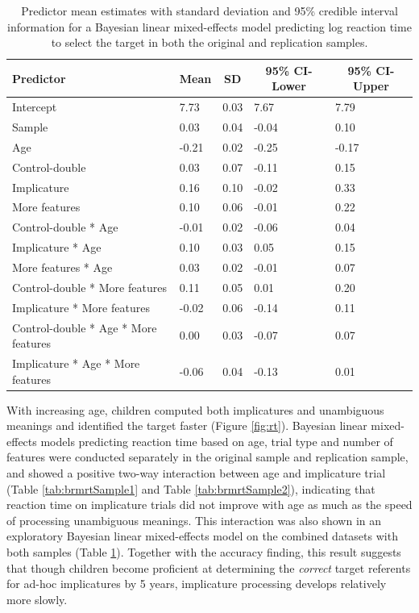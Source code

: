 \documentclass[man]{apa6}
\begin{document}
\begin{table}[tbp]
\begin{center}
\begin{threeparttable}
\caption{\label{tab:brmrt}Predictor mean estimates with standard deviation and 95\% credible interval information for a Bayesian linear mixed-effects model predicting log reaction time to select the target in both the original and replication samples.}
\begin{tabular}{lllll}
\toprule
Predictor & \multicolumn{1}{c}{Mean} & \multicolumn{1}{c}{SD} & \multicolumn{1}{c}{95\% CI-Lower} & \multicolumn{1}{c}{95\% CI-Upper}\\
\midrule
Intercept & 7.73 & 0.03 & 7.67 & 7.79\\
Sample & 0.03 & 0.04 & -0.04 & 0.10\\
Age & -0.21 & 0.02 & -0.25 & -0.17\\
Control-double & 0.03 & 0.07 & -0.11 & 0.15\\
Implicature & 0.16 & 0.10 & -0.02 & 0.33\\
More features & 0.10 & 0.06 & -0.01 & 0.22\\
Control-double * Age & -0.01 & 0.02 & -0.06 & 0.04\\
Implicature * Age & 0.10 & 0.03 & 0.05 & 0.15\\
More features * Age & 0.03 & 0.02 & -0.01 & 0.07\\
Control-double * More features & 0.11 & 0.05 & 0.01 & 0.20\\
Implicature * More features & -0.02 & 0.06 & -0.14 & 0.11\\
Control-double * Age * More features & 0.00 & 0.03 & -0.07 & 0.07\\
Implicature * Age * More features & -0.06 & 0.04 & -0.13 & 0.01\\
\bottomrule
\end{tabular}
\end{threeparttable}
\end{center}
\end{table}

With increasing age, children computed both implicatures and unambiguous
meanings and identified the target faster (Figure \ref{fig:rt}).
Bayesian linear mixed-effects models predicting reaction time based on
age, trial type and number of features were conducted separately in the
original sample and replication sample, and showed a positive two-way
interaction between age and implicature trial (Table
\ref{tab:brmrtSample1} and Table \ref{tab:brmrtSample2}), indicating
that reaction time on implicature trials did not improve with age as
much as the speed of processing unambiguous meanings. This interaction
was also shown in an exploratory Bayesian linear mixed-effects model on
the combined datasets with both samples (Table \ref{tab:brmrt}).
Together with the accuracy finding, this result suggests that though
children become proficient at determining the \emph{correct} target
referents for ad-hoc implicatures by 5 years, implicature processing
develops relatively more slowly.
\end{document}
